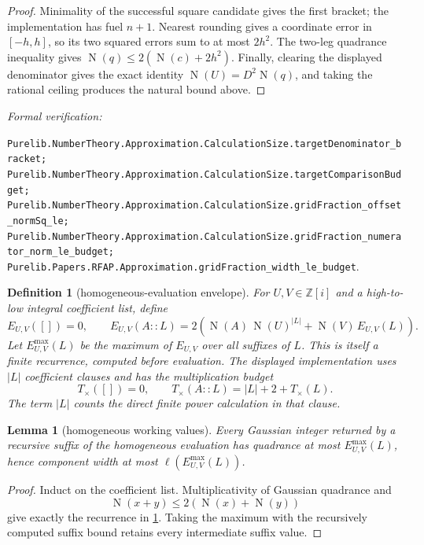 \documentclass[11pt]{article}
\newtheorem{lemma}[lemma]{Lemma}
\newtheorem{definition}[definition]{Definition}
\newcommand{\Zi}{\mathbb{Z}[i]}
\newcommand{\Norm}[1]{\operatorname{N}\!\left(#1\right)}
\newcommand{\leanref}[1]{\par\smallskip\noindent
  \emph{Formal verification:}\par\nobreak
  {\raggedright\nolinkurl{#1}.\par}}
\begin{document}
\begin{proof}
Minimality of the successful square candidate gives the first bracket; the
implementation has fuel $n+1$.  Nearest rounding gives a coordinate error in
$[-h,h]$, so its two squared errors sum to at most $2h^2$.  The two-leg
quadrance inequality gives
$\Norm q\le2(\Norm c+2h^2)$.  Finally, clearing the displayed denominator
gives the exact identity $\Norm U=D^2\Norm q$, and taking the rational ceiling
produces the natural bound above.
\end{proof}

\leanref{Purelib.NumberTheory.Approximation.CalculationSize.targetDenominator_bracket;
Purelib.NumberTheory.Approximation.CalculationSize.targetComparisonBudget;
Purelib.NumberTheory.Approximation.CalculationSize.gridFraction_offset_normSq_le;
Purelib.NumberTheory.Approximation.CalculationSize.gridFraction_numerator_norm_le_budget;
Purelib.Papers.RFAP.Approximation.gridFraction_width_le_budget}

\begin{definition}[homogeneous-evaluation envelope]
\label{def:homogeneous-envelope}
For $U,V\in\Zi$ and a high-to-low integral coefficient list, define
\[
 E_{U,V}([])=0,\qquad
 E_{U,V}(A::L)=2\left(
    \Norm A\,\Norm U^{|L|}+\Norm V\,E_{U,V}(L)\right).
\]
Let $E^{\max}_{U,V}(L)$ be the maximum of $E_{U,V}$ over all suffixes of
$L$.  This is itself a finite recurrence, computed before evaluation.
The displayed implementation uses $|L|$ coefficient clauses and has the
multiplication budget
\[
 T_{\times}([])=0,\qquad
 T_{\times}(A::L)=|L|+2+T_{\times}(L).
\]
The term $|L|$ counts the direct finite power calculation in that clause.
\end{definition}

\begin{lemma}[homogeneous working values]
\label{lem:homogeneous-envelope}
Every Gaussian integer returned by a recursive suffix of the homogeneous
evaluation has quadrance at most $E^{\max}_{U,V}(L)$, hence component width at
most $\ell(E^{\max}_{U,V}(L))$.
\end{lemma}

\begin{proof}
Induct on the coefficient list.  Multiplicativity of Gaussian quadrance and
\[
                  \Norm{x+y}\le2(\Norm x+\Norm y)
\]
give exactly the recurrence in \cref{def:homogeneous-envelope}.  Taking the
maximum with the recursively computed suffix bound retains every intermediate
suffix value.
\end{proof}
\end{document}
